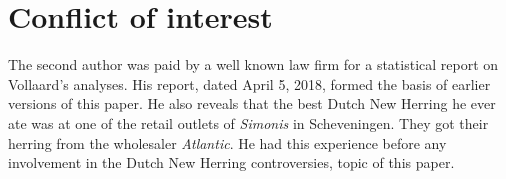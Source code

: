 \documentclass[alpha-refs]{wiley-article}
\begin{document}



\section{Conflict of interest}\label{COI}

The second author was paid by a well known law firm for a statistical report on Vollaard's analyses. His report, dated April 5, 2018, formed the basis of earlier versions of this paper. He also reveals that the best Dutch New Herring he ever ate was at one of the retail outlets of \emph{Simonis} in Scheveningen. They got their herring from the wholesaler \emph{Atlantic}. He had this experience before any involvement in the Dutch New Herring controversies, topic of this paper. 

% 

\end{document}
